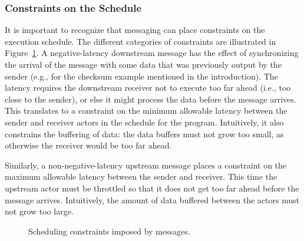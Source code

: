 \subsubsection*{Constraints on the Schedule}
\label{sec:constraints}
It is important to recognize that messaging can place constraints on
the execution schedule.  The different categories of constraints are
illustrated in Figure~\ref{tab:messcons}.  A negative-latency
downstream message has the effect of synchronizing the arrival of the
message with some data that was previously output by the sender (e.g.,
for the checksum example mentioned in the introduction).  The latency
requires the downstream receiver not to execute too far ahead (i.e.,
too close to the sender), or else it might process the data before the
message arrives.  This translates to a constraint on the minimum
allowable latency between the sender and receiver actors in the
schedule for the program.  Intuitively, it also constrains the
buffering of data: the data buffers must not grow too small, as
otherwise the receiver would be too far ahead.

Similarly, a non-negative-latency upstream message places a constraint
on the maximum allowable latency between the sender and receiver.
This time the upstream actor must be throttled so that it does not get
too far ahead before the message arrives.  Intuitively, the amount of
data buffered between the actors must not grow too large.

\begin{figure}[t]
\begin{center}
\vspace{4pt}
\vspace{-4pt}
\caption{Scheduling constraints imposed by messages.}
\label{tab:messcons}
\end{center}
\vspace{-18pt}
\end{figure}

